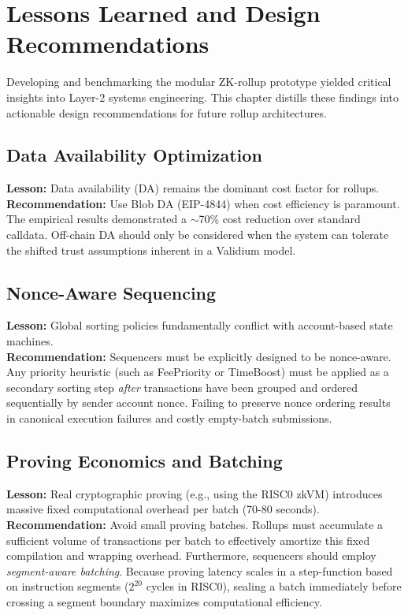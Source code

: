 \chapter{Lessons Learned and Design Recommendations}
\label{ch:lessons_learned}

Developing and benchmarking the modular ZK-rollup prototype yielded critical insights into Layer-2 systems engineering. This chapter distills these findings into actionable design recommendations for future rollup architectures.

\section{Data Availability Optimization}
\textbf{Lesson:} Data availability (DA) remains the dominant cost factor for rollups. \\
\textbf{Recommendation:} Use Blob DA (EIP-4844) when cost efficiency is paramount. The empirical results demonstrated a $\sim$70\% cost reduction over standard calldata. Off-chain DA should only be considered when the system can tolerate the shifted trust assumptions inherent in a Validium model.

\section{Nonce-Aware Sequencing}
\textbf{Lesson:} Global sorting policies fundamentally conflict with account-based state machines. \\
\textbf{Recommendation:} Sequencers must be explicitly designed to be nonce-aware. Any priority heuristic (such as FeePriority or TimeBoost) must be applied as a secondary sorting step \textit{after} transactions have been grouped and ordered sequentially by sender account nonce. Failing to preserve nonce ordering results in canonical execution failures and costly empty-batch submissions.

\section{Proving Economics and Batching}
\textbf{Lesson:} Real cryptographic proving (e.g., using the RISC0 zkVM) introduces massive fixed computational overhead per batch (70-80 seconds). \\
\textbf{Recommendation:} Avoid small proving batches. Rollups must accumulate a sufficient volume of transactions per batch to effectively amortize this fixed compilation and wrapping overhead. Furthermore, sequencers should employ \textit{segment-aware batching}. Because proving latency scales in a step-function based on instruction segments ($2^{20}$ cycles in RISC0), sealing a batch immediately before crossing a segment boundary maximizes computational efficiency.

